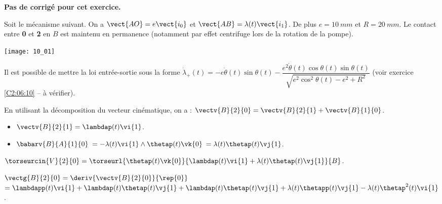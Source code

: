 \normaltrue \difficilefalse \tdifficilefalse
\correctiontrue

\setcounter{question}{0}
\ifcorrection
\else
\textbf{Pas de corrigé pour cet exercice.}
\fi

\ifprof
\else
Soit le mécanisme suivant. On a $\vect{AO}=e\vect{i_0}$ et $\vect{AB}=\lambda(t)\vect{i_1}$. De plus $e=\SI{10}{mm}$ et $R=\SI{20}{mm}$. Le contact entre \textbf{0} et \textbf{2} en $B$ est maintenu en permanence (notamment par effet centrifuge lors de la rotation de la pompe).
\begin{center}
\texttt{[image: 10\_01]}
\end{center}

Il est possible de mettre la loi entrée-sortie sous la forme 
$ \dot{\lambda}_{+}(t)= -e\dot{\theta}(t)\sin\theta(t)-  \dfrac{ e^2\dot{\theta}(t)\cos\theta(t)\sin\theta(t)}{ \sqrt{e^2\cos^2\theta(t)-e^2+R^2}}$
(voir exercice \ref{C2:06:10} -- à vérifier).

\fi



\ifprof

En utilisant la décomposition du vecteur cinématique, on a :
$\vectv{B}{2}{0} = \vectv{B}{2}{1}+\vectv{B}{1}{0}$.

\begin{itemize}
\item $\vectv{B}{2}{1} = \lambdap(t) \vi{1}$.
\item $\babarv{B}{A}{1}{0}$ $=-\lambda(t)\vi{1}\wedge\thetap(t)\vk{0}$ $=\lambda(t)\thetap(t)\vj{1}$.
\end{itemize}

$\torseurcin{V}{2}{0} = \torseurl{\thetap(t)\vk{0}}{\lambdap(t) \vi{1}+\lambda(t)\thetap(t)\vj{1}}{B}$.

\else
\fi


\ifprof

$\vectg{B}{2}{0} = \deriv{\vectv{B}{2}{0}}{\rep{0}}$
$= \lambdapp(t) \vi{1}+\lambdap(t) \thetap(t) \vj{1}+\lambdap(t)\thetap(t)\vj{1}+\lambda(t)\thetapp(t)\vj{1}-\lambda(t)\thetap^2(t)\vi{1} $.


\else
\fi


